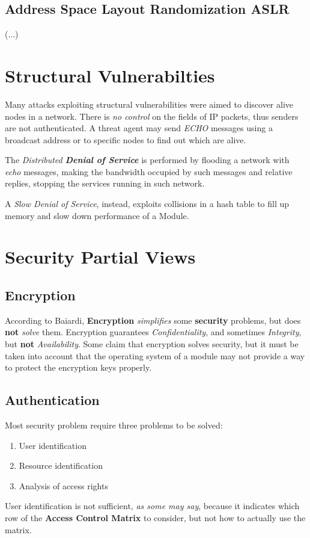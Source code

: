 \subsection{Address Space Layout Randomization ASLR}

(...)

\section{Structural Vulnerabilties}
Many attacks exploiting structural vulnerabilities were aimed to discover alive nodes in a network.
There is \textit{no control} on the fields of IP packets, thus senders are not authenticated.
A threat agent may send \textit{ECHO} messages using a broadcast address or to specific nodes to find out which are alive.

The \textit{Distributed \textbf{Denial of Service}} is performed by flooding a network with \textit{echo} messages,
making the bandwidth occupied by such messages and relative replies,
stopping the services running in such network.

A \textit{Slow Denial of Service}, instead, exploits collisions in a hash table to fill up memory and slow down performance of a Module.

\section{Security Partial Views}
\subsection{Encryption}
According to Baiardi, \textbf{Encryption} \textit{simplifies} some \textbf{security} problems, but does \textbf{not} \textit{solve} them.
Encryption guarantees \textit{Confidentiality}, and sometimes \textit{Integrity}, but \textbf{not} \textit{Availability}.
Some claim that encryption solves security, but it must be taken into account that the operating system of a module may not provide a way to protect the encryption keys properly.

\subsection{Authentication}
Most security problem require three problems to be solved:
\begin{enumerate}
    \item User identification
    \item Resource identification
    \item Analysis of access rights
\end{enumerate}
User identification is not sufficient, \textit{as some may say}, because it indicates which row of the \textbf{Access Control Matrix} to consider, but not how to actually use the matrix.

